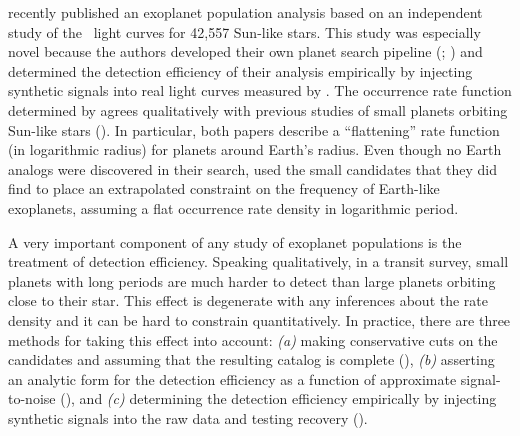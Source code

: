 \citet{Petigura:2013} recently published an exoplanet population analysis
based on an independent study of the \kepler\ light curves for 42,557 Sun-like
stars.
This study was especially novel because the authors developed their own
planet search pipeline (\terra; \citealt{Petigura:2013a}) and determined the
detection efficiency of their analysis empirically by injecting synthetic
signals into real light curves measured by \kepler.
The occurrence rate function determined by \citet{Petigura:2013} agrees
qualitatively with previous studies of small planets orbiting Sun-like stars
(\citealt{Dong:2013}).
In particular, both papers describe a ``flattening'' rate function (in
logarithmic radius) for planets around Earth's radius.
Even though no Earth analogs were discovered in their search,
\citet{Petigura:2013}
used the small candidates that they did find to place an extrapolated
constraint on the frequency of Earth-like exoplanets, assuming a flat
occurrence rate density in logarithmic period.

A very important component of any study of exoplanet populations is the
treatment of detection efficiency.
Speaking qualitatively, in a transit survey, small planets with long periods
are much harder to detect than large planets orbiting close to their star.
This effect is degenerate with any inferences about the rate density and it
can be hard to constrain quantitatively.
In practice, there are three methods for taking this effect into account:
\emph{(a)} making conservative cuts on the candidates and assuming that the
resulting catalog is complete (\citealt{Catanzarite:2011, Traub:2012,
Tremaine:2012}), \emph{(b)} asserting an analytic form for the detection
efficiency as a function of approximate signal-to-noise (\citealt{Youdin:2011,
Howard:2012, Dressing:2013, Dong:2013, Fressin:2013, Morton:2014}), and
\emph{(c)} determining the detection efficiency empirically by injecting
synthetic signals into the raw data and testing recovery
(\citealt{Christiansen:2013, Petigura:2013a, Petigura:2013}).

